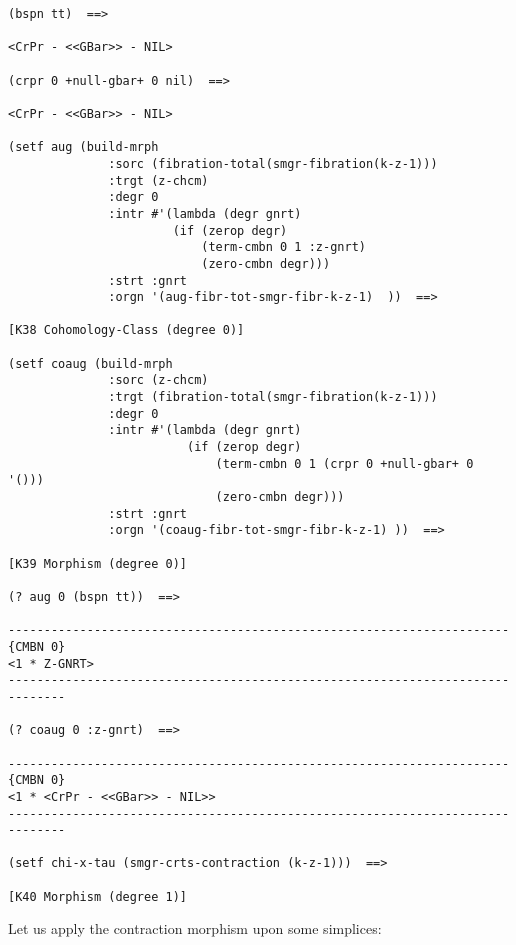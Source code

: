 {\footnotesize\begin{verbatim}
(bspn tt)  ==>

<CrPr - <<GBar>> - NIL>

(crpr 0 +null-gbar+ 0 nil)  ==>

<CrPr - <<GBar>> - NIL>

(setf aug (build-mrph
              :sorc (fibration-total(smgr-fibration(k-z-1))) 
              :trgt (z-chcm) 
              :degr 0
              :intr #'(lambda (degr gnrt)
                       (if (zerop degr)
                           (term-cmbn 0 1 :z-gnrt)
                           (zero-cmbn degr)))
              :strt :gnrt 
              :orgn '(aug-fibr-tot-smgr-fibr-k-z-1)  ))  ==>

[K38 Cohomology-Class (degree 0)]

(setf coaug (build-mrph
              :sorc (z-chcm) 
              :trgt (fibration-total(smgr-fibration(k-z-1))) 
              :degr 0
              :intr #'(lambda (degr gnrt)
                         (if (zerop degr)
                             (term-cmbn 0 1 (crpr 0 +null-gbar+ 0 '()))
                             (zero-cmbn degr)))
              :strt :gnrt
              :orgn '(coaug-fibr-tot-smgr-fibr-k-z-1) ))  ==>

[K39 Morphism (degree 0)]

(? aug 0 (bspn tt))  ==>

----------------------------------------------------------------------{CMBN 0}
<1 * Z-GNRT>
------------------------------------------------------------------------------

(? coaug 0 :z-gnrt)  ==>

----------------------------------------------------------------------{CMBN 0}
<1 * <CrPr - <<GBar>> - NIL>>
------------------------------------------------------------------------------

(setf chi-x-tau (smgr-crts-contraction (k-z-1)))  ==>

[K40 Morphism (degree 1)]
\end{verbatim}}
Let us apply the contraction morphism upon some simplices:
